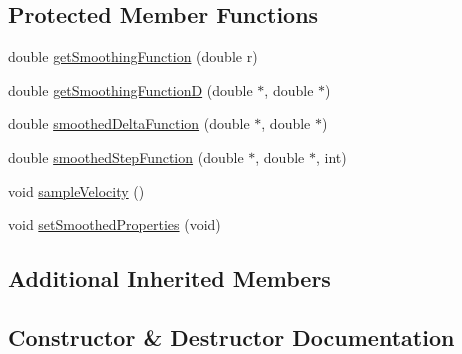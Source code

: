 \subsection*{Protected Member Functions}
\begin{DoxyCompactItemize}
\item 
double \hyperlink{class_incompress___solver___smooth__3_d___basis_a8cd2cd11861d3623352fdfdd88f3f4b6}{get\+Smoothing\+Function} (double r)
\item 
double \hyperlink{class_incompress___solver___smooth__3_d___basis_a08bf01c33c7db5d0699385b4465263e5}{get\+Smoothing\+FunctionD} (double $\ast$, double $\ast$)
\item 
double \hyperlink{class_incompress___solver___smooth__3_d___basis_a5d5813a304f553f47016805c2c6db54b}{smoothed\+Delta\+Function} (double $\ast$, double $\ast$)
\item 
double \hyperlink{class_incompress___solver___smooth__3_d___basis_af0fff5c06aaaebaadceee554767f1b71}{smoothed\+Step\+Function} (double $\ast$, double $\ast$, int)
\item 
void \hyperlink{class_incompress___solver___smooth__3_d___basis_a226c913f7f648baa6ed5faa2f6de55c3}{sample\+Velocity} ()
\item 
void \hyperlink{class_incompress___solver___smooth__3_d___basis_ade70c74f197d65087c7aa6f0fc57be55}{set\+Smoothed\+Properties} (void)
\end{DoxyCompactItemize}
\subsection*{Additional Inherited Members}


\subsection{Constructor \& Destructor Documentation}

